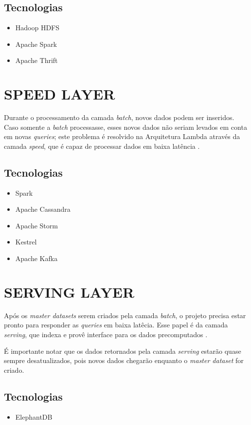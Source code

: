 \subsection{Tecnologias}

\begin{itemize}
  \item Hadoop HDFS
  \item Apache Spark
  \item Apache Thrift
\end{itemize}

\section{SPEED LAYER}

Durante o processamento da camada \textit{batch}, novos dados podem ser
inseridos. Caso somente a \textit{batch} processasse, esses novos dados não
seriam levados em conta em novas \textit{queries}; este problema é resolvido
na Arquitetura Lambda através da camada \textit{speed}, que é capaz de
processar dados em baixa latência \cite{marz2015}.

\subsection{Tecnologias}

\begin{itemize}
  \item Spark
  \item Apache Cassandra
  \item Apache Storm
  \item Kestrel
  \item Apache Kafka
\end{itemize}

\section{SERVING LAYER}

Após os \textit{master datasets} serem criados pela camada \textit{batch}, o
projeto precisa estar pronto para responder as \textit{queries} em baixa
latêcia. Esse papel é da camada \textit{serving}, que indexa e provê interface
para os dados precomputados \cite{marz2015}.

É importante notar que os dados retornados pela camada \textit{serving} estarão
quase sempre desatualizados, pois novos dados chegarão enquanto o
\textit{master dataset} for criado.

\subsection{Tecnologias}

\begin{itemize}
    \item ElephantDB
\end{itemize}

